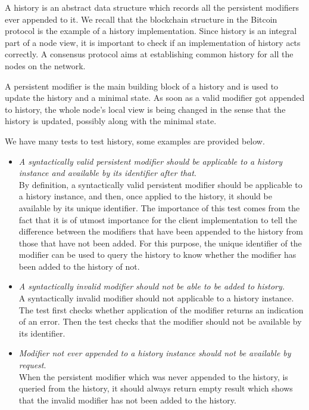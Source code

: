 \begin{enumerate}[\IEEEsetlabelwidth{Z}]
A history is an abstract data structure which records all the persistent modifiers ever appended to it. We recall that the blockchain structure in the Bitcoin protocol is the example of a history implementation. Since history is an integral part of a node view, it is important to check if an implementation of history acts correctly. A consensus protocol aims at establishing common history for all the nodes on the network.

A persistent modifier is the main building block of a history and is used to update the history and a minimal state. As soon as a valid modifier got appended to history, the whole node's local view is being changed in the sense that the history is updated, possibly along with the minimal state.

We have many tests to test history, some examples are provided below.

\begin{itemize}[]
\item \textit{A syntactically valid persistent modifier should be applicable to a history instance and available by its identifier after that}.\\
By definition, a syntactically valid persistent modifier should be applicable to a history instance, and then, once applied to the history, it should be available by its unique identifier. The importance of this test comes from the fact that it is of utmost importance for the client implementation to tell the difference between the modifiers that have been appended to the history from those that have not been added. For this purpose, the unique identifier of the modifier can be used to query the history to know whether the modifier has been added to the history of not.\\

\item \textit{A syntactically invalid modifier should not be able to be added to history.}\\

A syntactically invalid modifier should not applicable to a history instance. The test first checks whether application of the modifier returns an indication of an error. Then the test checks that the modifier should not be available by its identifier.\\

\item \textit{Modifier not ever appended to a history instance should not be available by request}.\\
When the persistent modifier which was never appended to the history, is queried from the history, it should always return empty result which shows that the invalid modifier has not been added to the history.\\


\end{itemize}
\end{enumerate}
